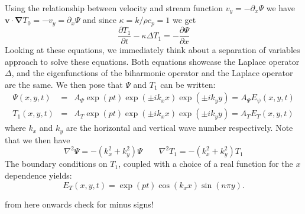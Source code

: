 Using the relationship between velocity and stream function
$v_y=-\partial_x \Psi$ we have ${\bm v}\cdot {\bm \nabla} T_0 = -v_y = \partial_x \Psi$ and since $\kappa =k/\rho c_p=1$ we get 
\begin{equation}
\boxed{
\frac{\partial T_1}{\partial t} - \kappa \Delta T_1 = -\frac{\partial \Psi}{\partial x}
}
\end{equation}
Looking at these equations, we immediately think about a separation of variables approach to solve these
equations. Both equations showcase the Laplace operator $\Delta$, and the eigenfunctions of the biharmonic operator and the Laplace operator are the same. 
We then pose that $\Psi$ and $T_1$ can be written:
\begin{eqnarray}
\Psi(x,y,t) &=& A_\Psi \exp(pt)\exp(\pm i k_x x) \exp(\pm i k_y y)= A_\Psi E_\psi(x,y,t) \\
T_1(x,y,t) &=& A_T \exp(pt) \exp(\pm i k_x x) \exp(\pm i k_y y)=A_T E_T(x,y,t) 
\end{eqnarray}
where $k_x$ and $k_y$ are the horizontal and vertical wave number respectively.
Note that we then have
\[
\nabla^2 \Psi = -(k_x^2+k_y^2) \Psi
\quad\quad
\nabla^2 T_1 = -(k_x^2+k_y^2) T_1
\]
The boundary conditions on $T_1$, coupled with a choice of a real function for the $x$ dependence yields:
\[
E_T(x,y,t) = \exp(pt) \cos (k_x x) \sin (n\pi y).
\]

{\color{red} from here onwards check for minus signs!}

